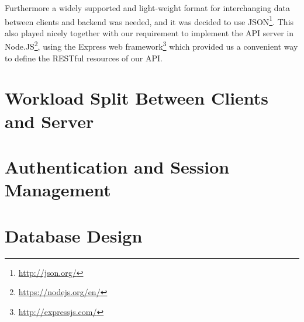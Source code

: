Furthermore a widely supported and light-weight format for interchanging data between clients and backend was needed, and it was decided to use JSON\footnote{\url{http://json.org/}}. This also played nicely together with our requirement to implement the API server in Node.JS\footnote{\url{https://nodejs.org/en/}}, using the Express web framework\footnote{\url{http://expressjs.com/}} which provided us a convenient way to define the RESTful resources of our API.


\vspace{0.5cm}

\section{Workload Split Between Clients and Server}


\vspace{0.5cm}

\section{Authentication and Session Management}


\vspace{0.5cm}

\section{Database Design}